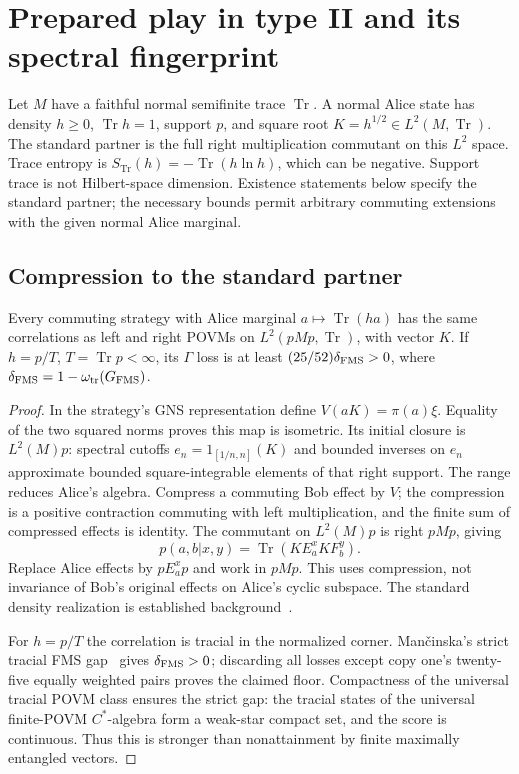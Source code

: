 \section{Prepared play in type II and its spectral fingerprint}\label{sec:semifinite}
Let $M$ have a faithful normal semifinite trace $\operatorname{Tr}$. A normal Alice state has density $h\ge0$, $\operatorname{Tr}h=1$, support $p$, and square root $K=h^{1/2}\in L^2(M,\operatorname{Tr})$. The standard partner is the full right multiplication commutant on this $L^2$ space. Trace entropy is $S_{\operatorname{Tr}}(h)=-\operatorname{Tr}(h\ln h)$, which can be negative. Support trace is not Hilbert-space dimension. Existence statements below specify the standard partner; the necessary bounds permit arbitrary commuting extensions with the given normal Alice marginal.

\subsection{Compression to the standard partner}
\begin{lemma}\label{lem:standard-reduction}
Every commuting strategy with Alice marginal $a\mapsto\operatorname{Tr}(ha)$ has the same correlations as left and right POVMs on $L^2(pMp,\operatorname{Tr})$, with vector $K$. If $h=p/T$, $T=\operatorname{Tr}p<\infty$, its $\Gamma$ loss is at least $(25/52)\delta_{\rm FMS}>0$, where $\delta_{\rm FMS}=1-\omega_{\rm tr}(G_{\mathrm{FMS}})$.
\end{lemma}
\begin{proof}
In the strategy's GNS representation define $V(aK)=\pi(a)\xi$. Equality of the two squared norms proves this map is isometric. Its initial closure is $L^2(M)p$: spectral cutoffs $e_n=1_{[1/n,n]}(K)$ and bounded inverses on $e_n$ approximate bounded square-integrable elements of that right support. The range reduces Alice's algebra. Compress a commuting Bob effect by $V$; the compression is a positive contraction commuting with left multiplication, and the finite sum of compressed effects is identity. The commutant on $L^2(M)p$ is right $pMp$, giving
\[
 p(a,b|x,y)=\operatorname{Tr}(K E_a^x K F_b^y).
\]
Replace Alice effects by $pE_a^xp$ and work in $pMp$. This uses compression, not invariance of Bob's original effects on Alice's cyclic subspace. The standard density realization is established background~\cite[Section 2]{CKLT}.

For $h=p/T$ the correlation is tracial in the normalized corner. Man\v{c}inska's strict tracial FMS gap~\cite[Theorem 3]{Mancinska} gives $\delta_{\rm FMS}>0$; discarding all losses except copy one's twenty-five equally weighted pairs proves the claimed floor. Compactness of the universal tracial POVM class ensures the strict gap: the tracial states of the universal finite-POVM $C^*$-algebra form a weak-star compact set, and the score is continuous. Thus this is stronger than nonattainment by finite maximally entangled vectors.
\end{proof}

